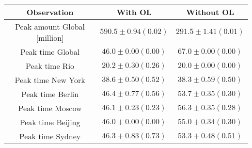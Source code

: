 \begin{tabular}[H]{c | c | c}
Observation & With OL & Without OL \\ \hline 
 Peak amount Global [million]& $590.5\pm 0.94 (0.02)$ & $291.5 \pm 1.41 (0.01)$\\ 
 Peak time Global & $46.0\pm 0.00( 0.00)$ & $67.0 \pm 0.00 (0.00)$\\ 
 Peak time Rio & $20.2\pm 0.30( 0.26)$ & $20.0 \pm 0.00 (0.00)$\\ 
 Peak time New York & $38.6\pm 0.50( 0.52)$ & $38.3 \pm 0.59 (0.50)$\\ 
 Peak time Berlin & $46.4\pm 0.77( 0.56)$ & $53.7 \pm 0.35 (0.30)$\\ 
 Peak time Moscow & $46.1\pm 0.23( 0.23)$ & $56.3 \pm 0.35 (0.28)$\\ 
 Peak time Beijing & $46.0\pm 0.00( 0.00)$ & $55.0 \pm 0.34 (0.30)$\\ 
 Peak time Sydney & $46.3\pm 0.83( 0.73)$ & $53.3 \pm 0.48 (0.51)$
\end{tabular}